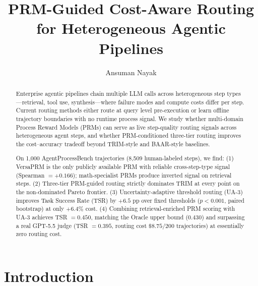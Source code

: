 \documentclass[sigconf,natbib=false]{acmart}
\begin{document}
\title{PRM-Guided Cost-Aware Routing for Heterogeneous Agentic Pipelines}

\author{Ansuman Nayak}

\begin{abstract}
Enterprise agentic pipelines chain multiple LLM calls across heterogeneous step
types---retrieval, tool use, synthesis---where failure modes and compute costs
differ per step.  Current routing methods either route at query level
pre-execution or learn offline trajectory boundaries with no runtime process
signal.  We study whether multi-domain Process Reward Models (PRMs) can serve
as live step-quality routing signals across heterogeneous agent steps, and
whether PRM-conditioned three-tier routing improves the cost--accuracy tradeoff
beyond TRIM-style and BAAR-style baselines.

On 1,000 AgentProcessBench trajectories (8,509 human-labeled steps), we find:
(1) VersaPRM is the only publicly available PRM with reliable cross-step-type
signal (Spearman $= +0.166$); math-specialist PRMs produce inverted signal on
retrieval steps.  (2) Three-tier PRM-guided routing strictly dominates TRIM at
every point on the non-dominated Pareto frontier.  (3) Uncertainty-adaptive
threshold routing (UA-3) improves Task Success Rate (TSR) by $+6.5$ pp over
fixed thresholds ($p < 0.001$, paired bootstrap) at only $+6.4\%$ cost.
(4) Combining retrieval-enriched PRM scoring with UA-3 achieves TSR $= 0.450$,
matching the Oracle upper bound ($0.430$) and surpassing a real GPT-5.5 judge
(TSR $= 0.395$, routing cost $\$8.75$/200 trajectories) at essentially zero
routing cost.
\end{abstract}


\maketitle

\section{Introduction}
\end{document}
